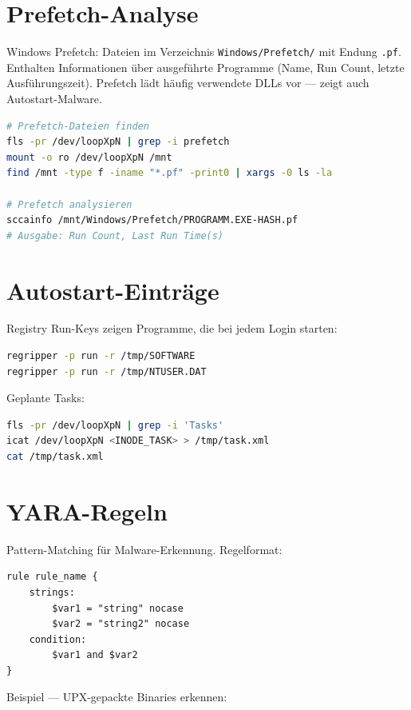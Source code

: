 \section{Prefetch-Analyse}

Windows Prefetch: Dateien im Verzeichnis \texttt{Windows/Prefetch/} mit Endung \texttt{.pf}.
Enthalten Informationen über ausgeführte Programme (Name, Run Count, letzte Ausführungszeit).
Prefetch lädt häufig verwendete DLLs vor — zeigt auch Autostart-Malware.

\begin{lstlisting}[language=bash]
# Prefetch-Dateien finden
fls -pr /dev/loopXpN | grep -i prefetch
mount -o ro /dev/loopXpN /mnt
find /mnt -type f -iname "*.pf" -print0 | xargs -0 ls -la

# Prefetch analysieren
sccainfo /mnt/Windows/Prefetch/PROGRAMM.EXE-HASH.pf
# Ausgabe: Run Count, Last Run Time(s)
\end{lstlisting}

\section{Autostart-Einträge}

Registry Run-Keys zeigen Programme, die bei jedem Login starten:

\begin{lstlisting}[language=bash]
regripper -p run -r /tmp/SOFTWARE
regripper -p run -r /tmp/NTUSER.DAT
\end{lstlisting}

Geplante Tasks:

\begin{lstlisting}[language=bash]
fls -pr /dev/loopXpN | grep -i 'Tasks'
icat /dev/loopXpN <INODE_TASK> > /tmp/task.xml
cat /tmp/task.xml
\end{lstlisting}

\section{YARA-Regeln}

Pattern-Matching für Malware-Erkennung.
Regelformat:

\begin{lstlisting}
rule rule_name {
    strings:
        $var1 = "string" nocase
        $var2 = "string2" nocase
    condition:
        $var1 and $var2
}
\end{lstlisting}

Beispiel — UPX-gepackte Binaries erkennen:

